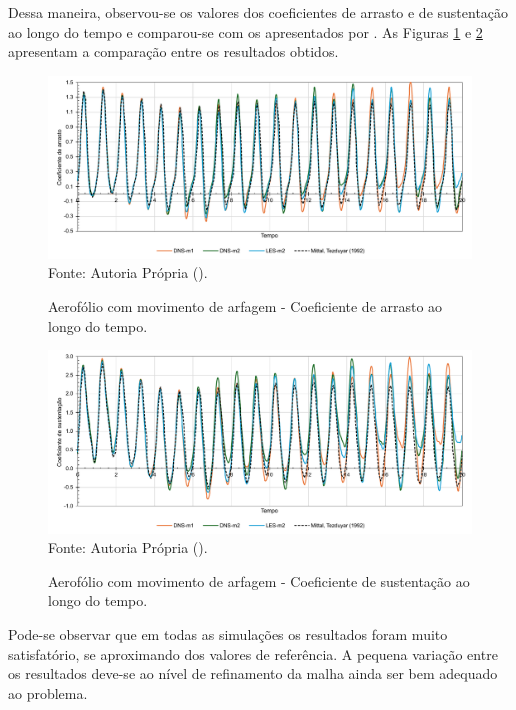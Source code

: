 Dessa maneira, observou-se os valores dos coeficientes de arrasto e de sustentação ao longo do tempo e comparou-se com os apresentados por . As Figuras \ref{fig:rotating-airfoil-Cd} e \ref{fig:rotating-airfoil-Cl} apresentam a comparação entre os resultados obtidos.

\begin{figure}[h!]
    \centering
    \caption{Aerofólio com movimento de arfagem - Coeficiente de arrasto ao longo do tempo.}
    \includegraphics[width=\linewidth]{Figuras/rotating-airfoil/Cd.pdf}
    \\Fonte: Autoria Própria (\the\year).
    \label{fig:rotating-airfoil-Cd}
\end{figure}

\begin{figure}[h!]
    \centering
    \caption{Aerofólio com movimento de arfagem - Coeficiente de sustentação ao longo do tempo.}
    \includegraphics[width=\linewidth]{Figuras/rotating-airfoil/Cl.pdf}
    \\Fonte: Autoria Própria (\the\year).
    \label{fig:rotating-airfoil-Cl}
\end{figure}

Pode-se observar que em todas as simulações os resultados foram muito satisfatório, se aproximando dos valores de referência. A pequena variação entre os resultados deve-se ao nível de refinamento da malha ainda ser bem adequado ao problema.

